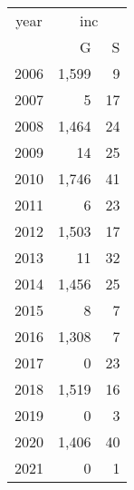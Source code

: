 \footnotesize\begin{tabular}[t]{lrr}
\toprule
\multicolumn{1}{c}{year} & \multicolumn{2}{c}{inc} \\
\cmidrule(l{3pt}r{3pt}){1-1} \cmidrule(l{3pt}r{3pt}){2-3}
  & G & S\\
\midrule
2006 & 1,599 & 9\\
2007 & 5 & 17\\
2008 & 1,464 & 24\\
2009 & 14 & 25\\
2010 & 1,746 & 41\\
2011 & 6 & 23\\
2012 & 1,503 & 17\\
2013 & 11 & 32\\
2014 & 1,456 & 25\\
2015 & 8 & 7\\
2016 & 1,308 & 7\\
2017 & 0 & 23\\
2018 & 1,519 & 16\\
2019 & 0 & 3\\
2020 & 1,406 & 40\\
2021 & 0 & 1\\
\bottomrule
\end{tabular}
